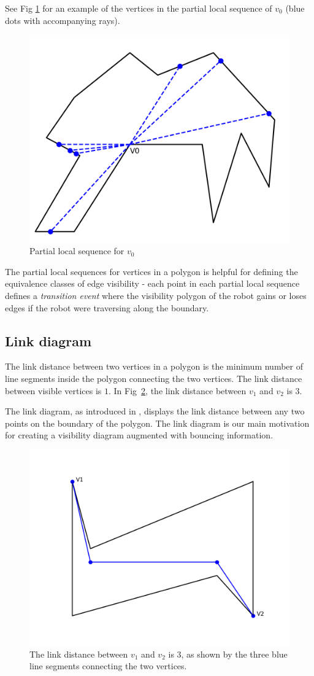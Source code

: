 \documentclass[]{article}  %
\begin{document}
See Fig \ref{fig:pls} for an example of the vertices in the partial local
sequence of $v_0$ (blue dots with accompanying rays).

\begin{figure}[h]
    \includegraphics[width=0.8\linewidth]{figures/partial_local_sequence.png}
    \caption{Partial local sequence for $v_0$}\label{fig:pls}
    \centering
\end{figure}

The partial local sequences for vertices in a polygon is helpful for defining
the equivalence classes of edge visibility - each point in each partial local
sequence defines a \emph{transition event} where the visibility polygon of the
robot gains or loses edges if the robot were traversing along the boundary.


\subsection{Link diagram}

The link distance between two vertices in a polygon is the minimum number of line segments inside the polygon connecting the two vertices. The link distance between visible vertices is $1$. In Fig~\ref{fig:link_dis}, the link distance between $v_1$ and $v_2$ is 3.

The link diagram, as introduced in \cite{tan_sweep}, displays the link distance between any two points on the boundary of the polygon. The link diagram is our main motivation for creating a visibility diagram augmented with bouncing information.
\begin{figure}
    \includegraphics[width=0.6\linewidth]{figures/link_distance.png}
    \centering
    \caption{The link distance between $v_1$ and $v_2$ is 3, as shown by the three blue line segments connecting the two vertices.}\label{fig:link_dis}
    \centering
\end{figure}
\end{document}
